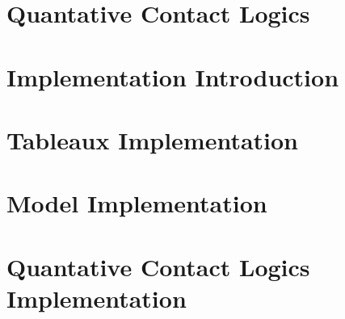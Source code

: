 \documentclass{article}
\begin{document}
	\section{Quantative Contact Logics}

	\newpage
	\section{Implementation Introduction}

	\newpage
	\section{Tableaux Implementation}

	\newpage
	\section{Model Implementation}

	\newpage
	\section{Quantative Contact Logics Implementation}
	
	
\end{document}
